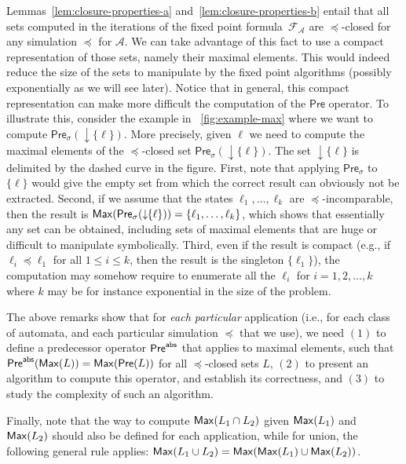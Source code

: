 \documentclass{LMCS}
\newcommand{\Pre}{\mathsf{Pre}}
\newcommand{\closure}[1]{\downarrow \!\!#1}
\renewcommand{\l}{{\ell}}
\newcommand{\A}{\mathcal{A}}
\newcommand{\F}{\mathcal{F}}
\newcommand{\Max}{{\sf Max}}
\begin{document}
Lemmas~\ref{lem:closure-properties-a} and~\ref{lem:closure-properties-b} 
entail that all sets computed in the iterations of the fixed point formula~$\F_{\A}$
are $\preceq$-closed for any simulation $\preceq$ for $\A$.
We can take advantage of this fact to use a compact representation of those
sets, namely their maximal elements. This would indeed reduce the size of the 
sets to manipulate by the fixed point algorithms (possibly exponentially as we 
will see later). Notice that in general, this compact representation can make 
more difficult the computation of the $\Pre$ operator. To illustrate this, consider
the example in \figurename~\ref{fig:example-max} where we want to compute 
$\Pre_\sigma(\closure{\{\l\}})$. More precisely, given $\l$ we need to compute
the maximal elements of the $\preceq$-closed set $\Pre_\sigma(\closure{\{\l\}})$.
The set $\closure{\{\l\}}$ is delimited by the dashed curve in the figure. 
First, note that applying $\Pre_\sigma$ to $\{\l\}$ would give the empty set
from which the correct result can obviously not be extracted. Second, if we assume
that the states $\l_1, \dots, \l_k$ are $\preceq$-incomparable, then the result 
is $\Max(\Pre_\sigma(\closure{\{\l\}})) = \{ \l_1, \dots, \l_k \}$, which shows 
that essentially any set can be obtained, including sets of maximal elements that 
are huge or difficult to manipulate symbolically. Third, even if the result is compact 
(e.g., if $\l_i \preceq \l_1$
for all $1 \leq i \leq k$, then the result is the singleton $\{\l_1\}$), the computation
may somehow require to enumerate all the $\l_i$ for $i=1,2,\dots,k$ where $k$
may be for instance exponential in the size of the problem. 

The above remarks show that for \emph{each particular} application (i.e., for
each class of automata, and each particular simulation $\preceq$ that we use),
we need $(1)$ to define a predecessor operator $\Pre^{{\sf abs}}$
that applies to maximal elements, such that $\Pre^{{\sf abs}}(\Max(L)) = \Max(\Pre(L))$ 
for all $\preceq$-closed sets $L$, $(2)$ to present an algorithm to compute this 
operator, and establish its correctness, and $(3)$ to study the complexity of 
such an algorithm.

Finally, note that the way to compute $\Max(L_1 \cap L_2)$ given $\Max(L_1)$ 
and $\Max(L_2)$ should also be defined for each application, while for union,
the following general rule applies:
$\Max(L_1 \cup L_2) = \Max(\Max(L_1) \cup \Max(L_2))$.
\end{document}
